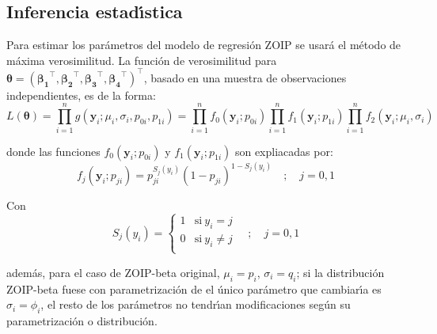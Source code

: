 \subsection{Inferencia estad\'{\i}stica}

Para estimar los par\'{a}metros del modelo de regresi\'{o}n ZOIP se usar\'{a} el m\'{e}todo de m\'{a}xima verosimilitud. La funci\'{o}n de verosimilitud para $\boldsymbol{\theta}=(\boldsymbol{\beta_1}^{\top},\boldsymbol{\beta_2}^{\top},\boldsymbol{\beta_3}^{\top}, \boldsymbol{\beta_4}^{\top})^{\top}$, basado en una muestra de observaciones independientes, es de la forma:
\begin{equation}
L(\boldsymbol{\theta})=\prod_{i=1}^{n}g(\mathbf{y}_i;\mu_i,\sigma_i,p_{0i},p_{1i})=\prod_{i=1}^{n}f_0(\mathbf{y}_i;p_{0i})\prod_{i=1}^{n}f_1(\mathbf{y}_i;p_{1i})\prod_{i=1}^{n}f_2(\mathbf{y}_i;\mu_i,\sigma_i)
\label{F_likel}
\end{equation}

donde las funciones $f_0(\mathbf{y}_i;p_{0i})$ y $f_1(\mathbf{y}_i;p_{1i})$ son expliacadas por:
\[
f_j(\mathbf{y}_i;p_{ji})={p_{ji}^{S_j(y_i)}(1-p_{ji})^{1-S_j(y_i)}} \quad ; \quad j=0,1
\]

Con
\[
S_j(y_i)=
\begin{cases}
1 & \text{si}\ y_i=j\\
0 & \text{si}\ y_i\neq j\\
\end{cases}
\quad ; \quad j=0,1
\]

adem\'{a}s, para el caso de ZOIP-beta original, $\mu_i=p_i$, $\sigma_i=q_i$; si la distribuci\'{o}n ZOIP-beta fuese con parametrizaci\'{o}n de \cite{Ferrari2} el \'{u}nico par\'{a}metro que cambiar\'{\i}a es $\sigma_i=\phi_i$, el resto de los par\'{a}metros no tendr\'{\i}an modificaciones seg\'{u}n su parametrizaci\'{o}n o distribuci\'{o}n.\\

